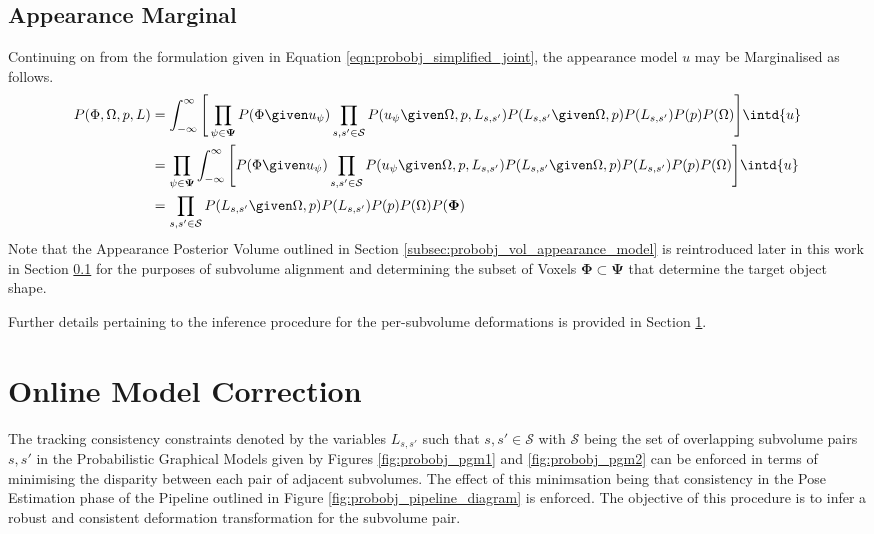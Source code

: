 \subsection{Appearance Marginal}
Continuing on from the formulation given in Equation
\ref{eqn:probobj_simplified_joint}, the appearance model $u$ may be Marginalised
as follows.
\begin{equation}
  \label{eqn:probobj_appearanc_marginal}
  \begin{split}
    P(\Phi, \Omega, p, L) & =
    \int_{-\infty}^{\infty} \Bigg[ 
    \prod_{\psi \in \mathbf{\Psi}} P(\Phi \given u_{\psi})
    \prod_{s, s' \in \mathcal{S}}P(u_{\psi} \given \Omega, p, L_{s, s'})
    P(L_{s, s'} \given \Omega, p) P(L_{s, s'})P(p)P(\Omega) \Bigg] \intd{u} \\
    & = \prod_{\psi \in \mathbf{\Psi}} 
    \int_{-\infty}^{\infty} \Bigg[ P(\Phi \given u_{\psi})
    \prod_{s, s' \in \mathcal{S}}P(u_{\psi} \given \Omega, p, L_{s, s'})
    P(L_{s, s'} \given \Omega, p) P(L_{s, s'})P(p)P(\Omega) \Bigg] \intd{u} \\
    & = \prod_{s, s' \in \mathcal{S}} P(L_{s, s'} \given \Omega, p)
    P(L_{s, s'})P(p)P(\Omega)P(\mathbf{\Phi})
  \end{split}
\end{equation}
Note that the Appearance Posterior Volume outlined in Section 
\ref{subsec:probobj_vol_appearance_model} is reintroduced later in this work in
Section \ref{} for the purposes of subvolume alignment and determining the
subset of Voxels $\mathbf{\Phi} \subset \mathbf{\Psi}$ that determine the target
object shape.

Further details pertaining to the inference procedure for the per-subvolume
deformations is provided in Section \ref{sec:probobj_model_correction}.

\section{Online Model Correction}
\label{sec:probobj_model_correction}
The tracking consistency constraints denoted by the variables $L_{s, s'}$ such
that $s, s' \in \mathcal{S}$ with $\mathcal{S}$ being the set of overlapping
subvolume pairs $s, s'$ in the Probabilistic Graphical Models given by Figures
\ref{fig:probobj_pgm1} and \ref{fig:probobj_pgm2} can be enforced in terms of
minimising the disparity between each pair of adjacent subvolumes. The effect of
this minimsation being that consistency in the Pose Estimation phase of the
Pipeline outlined in Figure \ref{fig:probobj_pipeline_diagram} is enforced. The
objective of this procedure is to infer a robust and consistent deformation
transformation for the subvolume pair.

